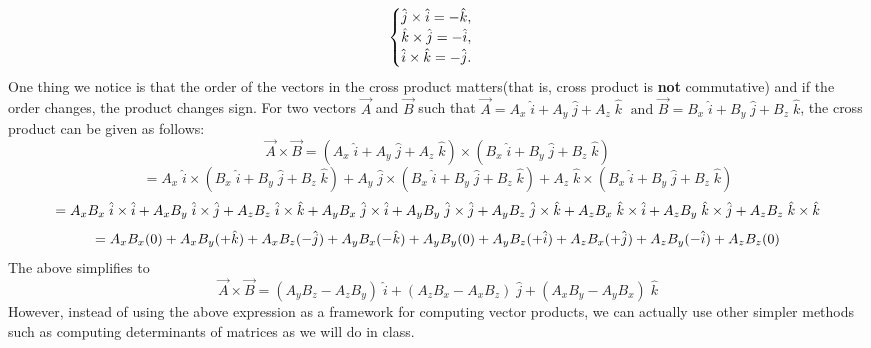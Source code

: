 \documentclass[9pt]{exam}
\begin{document}
$$\begin{cases} \hat{j} \times \hat{i} = - \hat{k}, \\ \hat{k} \times \hat{j} = - \hat{i}, \\ \hat{i} \times \hat{k} = - \hat{j} \ldotp \end{cases}$$
One thing we notice is that the order of the vectors in the cross product matters(that is, cross product is \textbf{not} commutative) and if the order changes, the product changes sign. For two vectors $\vec{A}$ and $\vec{B}$ such that $\vec{A} = A_{x}\; \hat{i} + A_{y}\; \hat{j} + A_{z}\; \hat{k}\; \text{ and } \vec{B} = B_{x}\; \hat{i} + B_{y}\; \hat{j} + B_{z}\; \hat{k}$, the cross product can be given as follows:
$$\vec{A} \times \vec{B}  = (A_{x}\; \hat{i} + A_{y}\; \hat{j} + A_{z}\; \hat{k}) \times (B_{x}\; \hat{i} + B_{y}\; \hat{j} + B_{z}\; \hat{k})$$
$$= A_{x}\; \hat{i} \times (B_{x}\; \hat{i} + B_{y}\; \hat{j} + B_{z}\; \hat{k}) + A_{y}\; \hat{j} \times (B_{x}\; \hat{i} + B_{y}\; \hat{j} + B_{z}\; \hat{k}) + A_{z}\; \hat{k} \times (B_{x}\; \hat{i} + B_{y}\; \hat{j} + B_{z}\; \hat{k}) $$
$$ = A_{x}B_{x}\; \hat{i} \times \hat{i} + A_{x}B_{y}\; \hat{i} \times \hat{j} + A_{z}B_{z}\; \hat{i} \times \hat{k} \\  + A_{y}B_{x}\; \hat{j} \times \hat{i} + A_{y}B_{y}\; \hat{j} \times \hat{j} + A_{y}B_{z}\; \hat{j} \times \hat{k} \\  + A_{z}B_{x}\; \hat{k} \times \hat{i} + A_{z}B_{y}\; \hat{k} \times \hat{j} + A_{z}B_{z}\; \hat{k} \times \hat{k} $$
$$= A_{x}B_{x}(0) + A_{x}B_{y}(+\hat{k}) + A_{x}B_{z}(-\hat{j}) \\  + A_{y}B_{x}(-\hat{k}) + A_{y}B_{y}(0) + A_{y}B_{z}(+\hat{i}) \\  + A_{z}B_{x}(+\hat{j}) + A_{z}B_{y}(- \hat{i}) + A_{z}B_{z}(0)$$
The above simplifies to
$$\vec{A} \times \vec{B} = (A_{y}B_{z} - A_{z}B_{y})\; \hat{i} + (A_{z}B_{x} - A_{x}B_{z})\; \hat{j} + (A_{x}B_{y} - A_{y}B_{x})\; \hat{k}$$
However, instead of using the above expression as a framework for computing vector products, we can actually use other simpler methods such as computing determinants of matrices as we will do in class.
\end{document}

